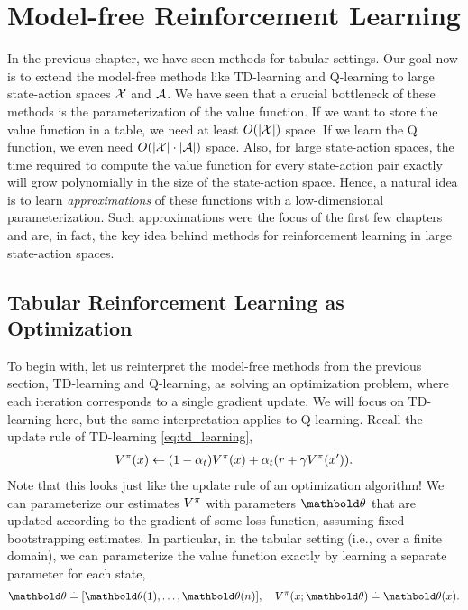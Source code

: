 \chapter{Model-free Reinforcement Learning}\label{sec:mfarl}

In the previous chapter, we have seen methods for tabular settings.
Our goal now is to extend the model-free methods like TD-learning and Q-learning to large state-action spaces $\mathcal{X}$ and $\mathcal{A}$.
We have seen that a crucial bottleneck of these methods is the parameterization of the value function.
If we want to store the value function in a table, we need at least $\BigO{\card{\spX}}$ space.
If we learn the Q function, we even need $\BigO{\card{\spX} \cdot \card{\spA}}$ space.
Also, for large state-action spaces, the time required to compute the value function for every state-action pair exactly will grow polynomially in the size of the state-action space. Hence, a natural idea is to learn \emph{approximations} of these functions with a low-dimensional parameterization.
Such approximations were the focus of the first few chapters and are, in fact, the key idea behind methods for reinforcement learning in large state-action spaces.

\section{Tabular Reinforcement Learning as Optimization}\label{sec:mfarl:tabular_rl_as_optimization}

To begin with, let us reinterpret the model-free methods from the previous section, TD-learning and Q-learning, as solving an optimization problem, where each iteration corresponds to a single gradient update.
We will focus on TD-learning here, but the same interpretation applies to Q-learning.
Recall the update rule of TD-learning \eqref{eq:td_learning}, \begin{align*}
  \V[\pi]{x} \gets (1-\alpha_t) \V[\pi]{x} + \alpha_t (r + \gamma \V[\pi]{x'}).
\end{align*}
Note that this looks just like the update rule of an optimization algorithm!
We can parameterize our estimates $\fnV[\pi]$ with parameters $\vtheta$ that are updated according to the gradient of some loss function, assuming fixed bootstrapping estimates.
In particular, in the tabular setting (i.e., over a finite domain), we can parameterize the value function exactly by learning a separate parameter for each state, \begin{align}
  \vtheta \defeq [\vtheta(1), \dots, \vtheta(n)], \quad \V[\pi]{x; \vtheta} \defeq \vtheta(x).
\end{align}

